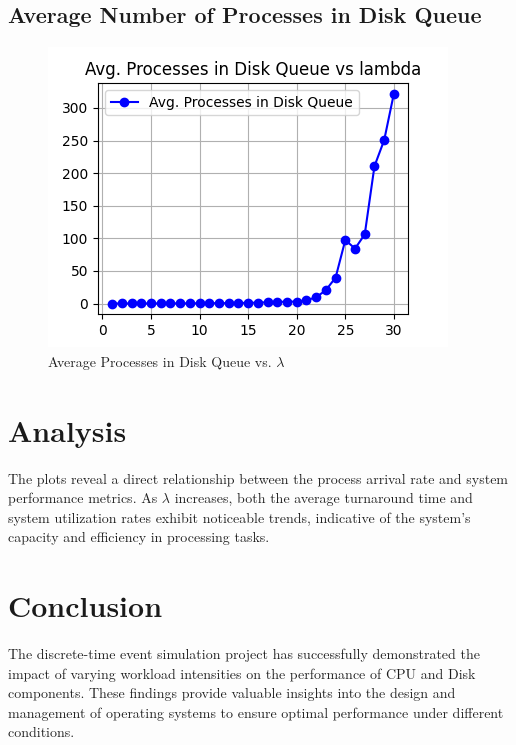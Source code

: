 \documentclass[12pt]{article}
\begin{document}
\subsection{Average Number of Processes in Disk Queue}
\begin{figure}[H]
\centering
\centerline{\includegraphics{figs/Avg. Processes in Disk Queue_vs_lambda.png}}
\caption{Average Processes in Disk Queue vs. $\lambda$}
\end{figure}

\section{Analysis}
The plots reveal a direct relationship between the process arrival rate and system performance metrics. As $\lambda$ increases, both the average turnaround time and system utilization rates exhibit noticeable trends, indicative of the system's capacity and efficiency in processing tasks.

\section{Conclusion}
The discrete-time event simulation project has successfully demonstrated the impact of varying workload intensities on the performance of CPU and Disk components. These findings provide valuable insights into the design and management of operating systems to ensure optimal performance under different conditions.
\end{document}
